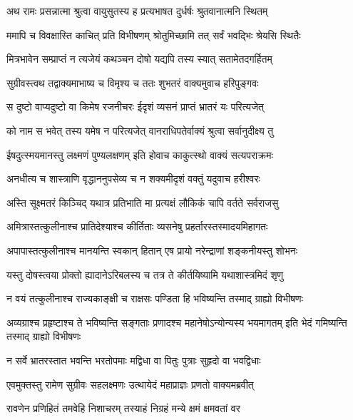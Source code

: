 
\twolineshloka
{अथ रामः प्रसन्नात्मा श्रुत्वा वायुसुतस्य ह}
{प्रत्यभाषत दुर्धर्षः श्रुतवानात्मनि स्थितम्} %

\twolineshloka
{ममापि च विवक्षास्ति काचित् प्रति विभीषणम्}
{श्रोतुमिच्छामि तत् सर्वं भवद्भिः श्रेयसि स्थितैः} %

\twolineshloka
{मित्रभावेन सम्प्राप्तं न त्यजेयं कथञ्चन}
{दोषो यद्यपि तस्य स्यात् सतामेतदगर्हितम्} %

\twolineshloka
{सुग्रीवस्त्वथ तद्वाक्यमाभाष्य च विमृश्य च}
{ततः शुभतरं वाक्यमुवाच हरिपुङ्गवः} %

\twolineshloka
{स दुष्टो वाप्यदुष्टो वा किमेष रजनीचरः}
{ईदृशं व्यसनं प्राप्तं भ्रातरं यः परित्यजेत्} %

\twolineshloka
{को नाम स भवेत् तस्य यमेष न परित्यजेत्}
{वानराधिपतेर्वाक्यं श्रुत्वा सर्वानुदीक्ष्य तु} %

\twolineshloka
{ईषदुत्स्मयमानस्तु लक्ष्मणं पुण्यलक्षणम्}
{इति होवाच काकुत्स्थो वाक्यं सत्यपराक्रमः} %

\twolineshloka
{अनधीत्य च शास्त्राणि वृद्धाननुपसेव्य च}
{न शक्यमीदृशं वक्तुं यदुवाच हरीश्वरः} %

\twolineshloka
{अस्ति सूक्ष्मतरं किञ्चिद् यथात्र प्रतिभाति मा}
{प्रत्यक्षं लौकिकं चापि वर्तते सर्वराजसु} %

\twolineshloka
{अमित्रास्तत्कुलीनाश्च प्रातिदेश्याश्च कीर्तिताः}
{व्यसनेषु प्रहर्तारस्तस्मादयमिहागतः} %

\twolineshloka
{अपापास्तत्कुलीनाश्च मानयन्ति स्वकान् हितान्}
{एष प्रायो नरेन्द्राणां शङ्कनीयस्तु शोभनः} %

\twolineshloka
{यस्तु दोषस्त्वया प्रोक्तो ह्यादानेऽरिबलस्य च}
{तत्र ते कीर्तयिष्यामि यथाशास्त्रमिदं शृणु} %

\twolineshloka
{न वयं तत्कुलीनाश्च राज्यकाङ्क्षी च राक्षसः}
{पण्डिता हि भविष्यन्ति तस्माद् ग्राह्यो विभीषणः} %

\threelineshloka
{अव्यग्राश्च प्रहृष्टाश्च ते भविष्यन्ति सङ्गताः}
{प्रणादश्च महानेषोऽन्योन्यस्य भयमागतम्}
{इति भेदं गमिष्यन्ति तस्माद् ग्राह्यो विभीषणः} %

\twolineshloka
{न सर्वे भ्रातरस्तात भवन्ति भरतोपमाः}
{मद्विधा वा पितुः पुत्राः सुहृदो वा भवद्विधाः} %

\twolineshloka
{एवमुक्तस्तु रामेण सुग्रीवः सहलक्ष्मणः}
{उत्थायेदं महाप्राज्ञः प्रणतो वाक्यमब्रवीत्} %

\twolineshloka
{रावणेन प्रणिहितं तमवेहि निशाचरम्}
{तस्याहं निग्रहं मन्ये क्षमं क्षमवतां वर} %

